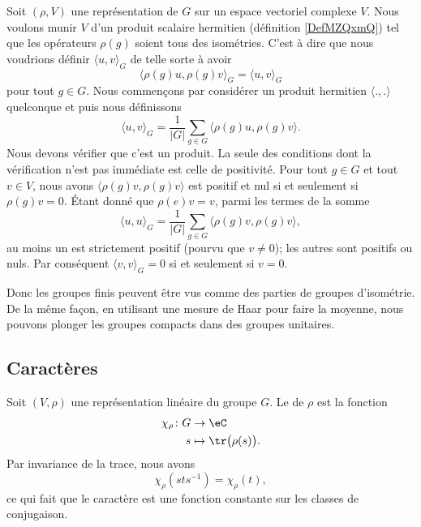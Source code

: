 Soit \( (\rho,V)\) une représentation de \( G\) sur un espace vectoriel complexe \( V\). Nous voulons munir \( V\) d'un produit scalaire hermitien (définition \ref{DefMZQxmQ}) tel que les opérateurs \( \rho(g)\) soient tous des isométries. C'est à dire que nous voudrions définir \( \langle u, v\rangle_G\) de telle sorte à avoir
\begin{equation}
    \langle \rho(g)u, \rho(g)v\rangle_G =\langle u, v\rangle_G
\end{equation}
pour tout \( g\in G\). Nous commençons par considérer un produit hermitien \( \langle ., .\rangle \) quelconque et puis nous définissons
\begin{equation}
    \langle u, v\rangle_G=\frac{1}{ | G | }\sum_{g\in G}\langle \rho(g)u, \rho(g)v\rangle.
\end{equation}
Nous devons vérifier que c'est un produit. La seule des conditions dont la vérification n'est pas immédiate est celle de positivité. Pour tout \( g\in G\) et tout \( v\in V\), nous avons \( \langle \rho(g)v, \rho(g)v\rangle \) est positif et nul si et seulement si \( \rho(g)v=0\). Étant donné que \( \rho(e)v=v\), parmi les termes de la somme
\begin{equation}
    \langle u, u\rangle_G=\frac{1}{ | G | }\sum_{g\in G}\langle \rho(g)v, \rho(g)v\rangle,
\end{equation}
au moins un est strictement positif (pourvu que \( v\neq 0\)); les autres sont positifs ou nuls. Par conséquent \( \langle v, v\rangle_G=0\) si et seulement si \( v=0\).

Donc les groupes finis peuvent être vus comme des parties de groupes d'isométrie. De la même façon, en utilisant une mesure de Haar pour faire la moyenne, nous pouvons plonger les groupes compacts dans des groupes unitaires.

\subsection{Caractères}

Soit \( (V,\rho)\) une représentation linéaire du groupe \( G\). Le  de \( \rho\) est la fonction
\begin{equation}
    \begin{aligned}
        \chi_{\rho}\colon G&\to \eC \\
        s&\mapsto \tr\big( \rho(s) \big).
    \end{aligned}
\end{equation}
Par invariance de la trace, nous avons
\begin{equation}
    \chi_{\rho}(sts^{-1})=\chi_{\rho}(t),
\end{equation}
ce qui fait que le caractère est une fonction constante sur les classes de conjugaison.

